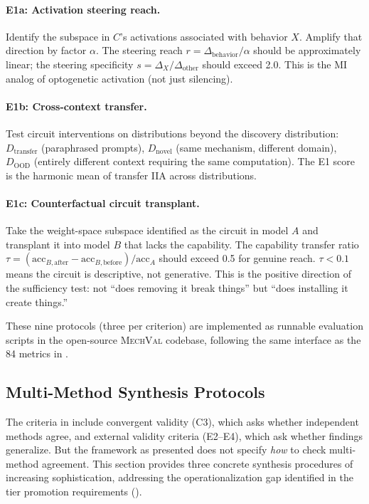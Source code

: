 \documentclass[10pt]{article}
\newcommand{\mechval}{\textsc{MechVal}}
\begin{document}
\paragraph{E1a: Activation steering reach.} Identify the subspace in $C$'s activations associated with behavior $X$. Amplify that direction by factor $\alpha$. The steering reach $r = \Delta_{\text{behavior}} / \alpha$ should be approximately linear; the steering specificity $s = \Delta_X / \Delta_{\text{other}}$ should exceed 2.0. This is the MI analog of optogenetic activation (not just silencing).

\paragraph{E1b: Cross-context transfer.} Test circuit interventions on distributions beyond the discovery distribution: $D_{\text{transfer}}$ (paraphrased prompts), $D_{\text{novel}}$ (same mechanism, different domain), $D_{\text{OOD}}$ (entirely different context requiring the same computation). The E1 score is the harmonic mean of transfer IIA across distributions.

\paragraph{E1c: Counterfactual circuit transplant.} Take the weight-space subspace identified as the circuit in model $A$ and transplant it into model $B$ that lacks the capability. The capability transfer ratio $\tau = (\text{acc}_{B,\text{after}} - \text{acc}_{B,\text{before}}) / \text{acc}_A$ should exceed 0.5 for genuine reach. $\tau < 0.1$ means the circuit is descriptive, not generative. This is the positive direction of the sufficiency test: not ``does removing it break things'' but ``does installing it create things.''

These nine protocols (three per criterion) are implemented as runnable evaluation scripts in the open-source \mechval{} codebase, following the same interface as the 84 metrics in .

\subsection{Multi-Method Synthesis Protocols}
\label{sec:synthesis}

The criteria in  include convergent validity (C3), which asks whether independent methods agree, and external validity criteria (E2--E4), which ask whether findings generalize. But the framework as presented does not specify \emph{how} to check multi-method agreement. This section provides three concrete synthesis procedures of increasing sophistication, addressing the operationalization gap identified in the tier promotion requirements ().
\end{document}
